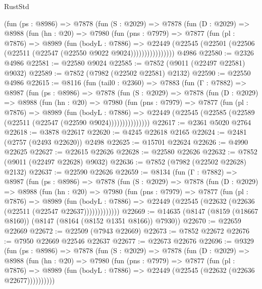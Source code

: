 \begin{lexlean}{RustStd}
\begin{coremodule}
          (fun (ps : @8986) =>
          @7878
            (fun (S : @2029) =>
            @7878
              (fun (D : @2029) =>
              @8988
                (fun (hn : @20) =>
                @7980
                  (fun (pns : @7979) =>
                  @7877
                    (fun (pl : @7876) =>
                    @8989
                      (fun (bodyL : @7886) =>
                      @22449
                        (@22545 (@22501 (@22506 (@22511 (@22547 (@22550 @9022 @9024))))))))))))))))
    @4986
@22580 := @2326 @4986
@22581 := @22580 @9024
@22585 := @7852 (@9011 (@22497 @22581) @9032)
@22589 := @7852 (@7982 (@22502 @22581) @2132)
@22590 := @22550 @4986
@22615 := @8116
    (fun (tail0 : @2360) =>
    @7883
      (fun (Γ : @7882) =>
      @8987
        (fun (ps : @8986) =>
        @7878
          (fun (S : @2029) =>
          @7878
            (fun (D : @2029) =>
            @8988
              (fun (hn : @20) =>
              @7980
                (fun (pns : @7979) =>
                @7877
                  (fun (pl : @7876) =>
                  @8989
                    (fun (bodyL : @7886) =>
                    @22449 (@22545 (@22585 (@22589 (@22511 (@22547 (@22590 @9024)))))))))))))))
@22617 := @2361 @5020 @2764
@22618 := @3878 @22617
@22620 := @4245 @22618 @2165
@22624 := @2481 (@2757 (@2493 @22620)) @2498
@22625 := @15701 @22624
@22626 := @4990 @22625
@22627 := @22615 @22626
@22628 := @22580 @22626
@22632 := @7852 (@9011 (@22497 @22628) @9032)
@22636 := @7852 (@7982 (@22502 @22628) @2132)
@22637 := @22590 @22626
@22659 := @8134
    (fun (Γ : @7882) =>
    @8987
      (fun (ps : @8986) =>
      @7878
        (fun (S : @2029) =>
        @7878
          (fun (D : @2029) =>
          @8988
            (fun (hn : @20) =>
            @7980
              (fun (pns : @7979) =>
              @7877
                (fun (pl : @7876) =>
                @8989
                  (fun (bodyL : @7886) =>
                  @22449 (@22545 (@22632 (@22636 (@22511 (@22547 @22637)))))))))))))
@22669 := @14635 (@8147 (@8159 (@18667 @8160)) (@8147 (@8164 (@8152 @1351 @8166)) @7930))
@22670 := @22659 @22669
@22672 := @22509 (@7943 @22669)
@22673 := @7852 @22672
@22676 := @7950 @22669 @22546 @22637
@22677 := @22673 @22676
@22696 := @9329
    (fun (ps : @8986) =>
    @7878
      (fun (S : @2029) =>
      @7878
        (fun (D : @2029) =>
        @8988
          (fun (hn : @20) =>
          @7980
            (fun (pns : @7979) =>
            @7877
              (fun (pl : @7876) =>
              @8989 (fun (bodyL : @7886) => @22449 (@22545 (@22632 (@22636 @22677))))))))))

\end{coremodule}
\end{lexlean}
